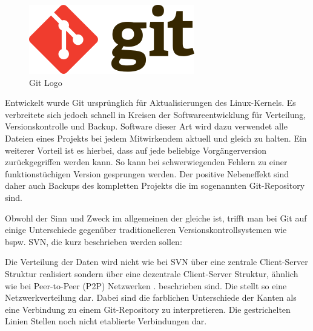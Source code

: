 \documentclass[12pt, twoside, a4paper, ngerman]{article}
\begin{document}
\begin{figure}
 \begin{center}
   \includegraphics[scale=0.5]{img/git_logo.png}
 \end{center}
 \caption[\textbf{Git Logo}\protect\newline Quelle: \url{http://upload.wikimedia.org/wikipedia/commons/thumb/e/e0/Git-logo.svg/273px-Git-logo.svg.png}]{Git Logo}
 \label{fig:git_logo}
\end{figure}

Entwickelt wurde Git ursprünglich für Aktualisierungen des Linux-Kernels. Es verbreitete sich jedoch schnell in Kreisen der Softwareentwicklung für Verteilung, Versionskontrolle und Backup.
Software dieser Art wird dazu verwendet alle Dateien eines Projekts bei jedem Mitwirkendem aktuell und gleich zu halten. Ein weiterer Vorteil ist es hierbei, dass auf jede beliebige Vorgängerversion zurückgegriffen werden kann. So kann bei schwerwiegenden Fehlern zu einer funktionstüchigen Version gesprungen werden. Der positive Nebeneffekt sind daher auch Backups des kompletten Projekts die im sogenannten Git-Repository sind. 

Obwohl der Sinn und Zweck im allgemeinen der gleiche ist, trifft man bei Git auf einige Unterschiede gegenüber traditionelleren Versionskontrollsystemen wie bspw. SVN, die kurz beschrieben werden sollen:

Die Verteilung der Daten wird nicht wie bei SVN über eine zentrale Client-Server Struktur realisiert sondern über eine dezentrale Client-Server Struktur, ähnlich wie bei \gls{Peer-to-Peer} (P2P) Netzwerken \cite{MahSchP2P}. beschrieben sind. Die  stellt so eine Netzwerkverteilung dar. Dabei sind die farblichen Unterschiede der Kanten als eine Verbindung zu einem Git-Repository zu interpretieren. Die gestrichelten Linien Stellen noch nicht etablierte Verbindungen dar.
\end{document}
